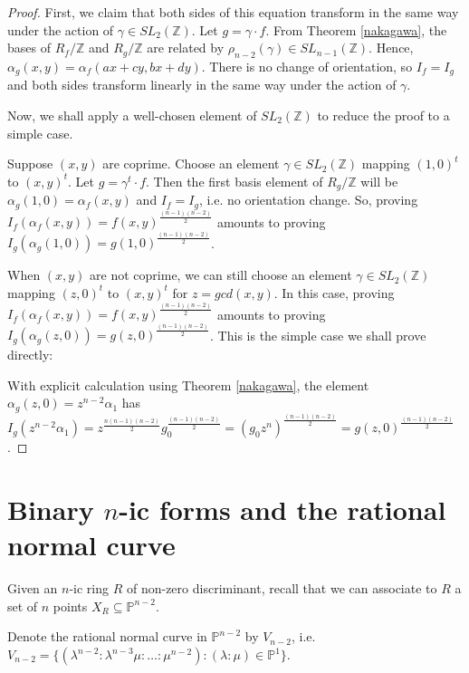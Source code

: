 \documentclass{report}
\begin{document}
\begin{proof}
First, we claim that both sides of this equation transform in the same way under the action of $\gamma \in SL_2(\mathbb{Z})$.  Let $g = \gamma \cdot f$.  From Theorem \ref{nakagawa}, the bases of $R_f / \mathbb{Z}$ and $R_g / \mathbb{Z}$ are related by $\rho_{n-2}(\gamma) \in SL_{n-1}(\mathbb{Z})$.   Hence, $\alpha_g (x,y) = \alpha_f (ax+cy,bx+dy)$.  There is no change of orientation, so $I_f = I_g$ and both sides transform linearly in the same way under the action of $\gamma$.

Now, we shall apply a well-chosen element of $SL_2(\mathbb{Z})$ to reduce the proof to a simple case.

Suppose $(x,y)$ are coprime.  Choose an element $\gamma \in SL_2(\mathbb{Z})$ mapping $(1,0)^t$ to $(x,y)^t$.  Let $g = \gamma^t \cdot f$.  Then the first basis element of $R_g / \mathbb{Z}$ will be $\alpha_g(1,0) = \alpha_f(x,y)$ and $I_f = I_g$, i.e. no orientation change.  So, proving $I_f(\alpha_f(x,y)) = f(x,y)^{\frac{(n-1)(n-2)}{2}}$ amounts to proving $I_g(\alpha_g(1,0)) = g(1,0)^{\frac{(n-1)(n-2)}{2}}$.

When $(x,y)$ are not coprime, we can still choose an element $\gamma \in SL_2(\mathbb{Z})$ mapping $(z,0)^t$ to $(x,y)^t$ for $z = gcd(x,y)$.  In this case, proving $I_f(\alpha_f(x,y)) = f(x,y)^{\frac{(n-1)(n-2)}{2}}$ amounts to proving $I_g(\alpha_g(z,0)) = g(z,0)^{\frac{(n-1)(n-2)}{2}}$.  This is the simple case we shall prove directly:

With explicit calculation using Theorem \ref{nakagawa}, the element $\alpha_g(z,0) = z^{n-2} \alpha_1$ has $I_g( z^{n-2} \alpha_1 ) = z^\frac{n(n-1)(n-2)}{2} g_0^\frac{(n-1)(n-2)}{2} = (g_0 z^n)^\frac{(n-1)(n-2)}{2} = g(z,0)^\frac{(n-1)(n-2)}{2}$.
\end{proof}

\section{Binary $n$-ic forms and the rational normal curve}

Given an $n$-ic ring $R$ of non-zero discriminant, recall that we can associate to $R$ a set of $n$ points $X_R \subseteq \mathbb{P}^{n-2}$.

\begin{definition}
Denote the rational normal curve in $\mathbb{P}^{n-2}$ by $V_{n-2}$, i.e. $V_{n-2} = \{ ( \lambda^{n-2} : \lambda^{n-3} \mu : \ldots : \mu^{n-2} ) : ( \lambda : \mu ) \in \mathbb{P}^1 \}$.
\end{definition}
\end{document}

